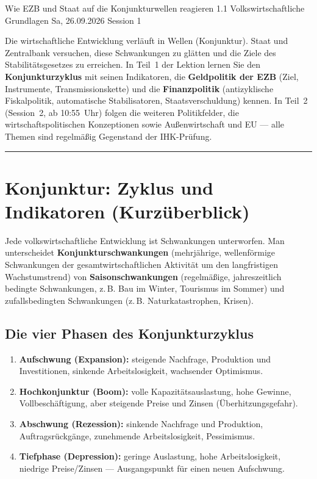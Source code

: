 \documentclass[11pt, a4paper]{article}
\begin{document}
%
  {Wie EZB und Staat auf die Konjunkturwellen reagieren}%
  {1.1 Volkswirtschaftliche Grundlagen}%
  {Sa, 26.09.2026 \textperiodcentered{} Session 1}

\begin{merksatz}[title={\bfseries Worum geht es in diesem Teil?}]
Die wirtschaftliche Entwicklung verläuft in Wellen (Konjunktur). Staat und Zentralbank
versuchen, diese Schwankungen zu glätten und die Ziele des Stabilitätsgesetzes zu erreichen.
In Teil~1 der Lektion lernen Sie den \textbf{Konjunkturzyklus} mit seinen Indikatoren, die
\textbf{Geldpolitik der EZB} (Ziel, Instrumente, Transmissionskette) und die
\textbf{Finanzpolitik} (antizyklische Fiskalpolitik, automatische Stabilisatoren,
Staatsverschuldung) kennen. In Teil~2 (Session~2, ab 10:55~Uhr) folgen die weiteren
Politikfelder, die wirtschaftspolitischen Konzeptionen sowie Außenwirtschaft und EU ---
alle Themen sind regelmäßig Gegenstand der IHK-Prüfung.
\end{merksatz}

\tableofcontents
\vspace{1em}
\hrule
\vspace{1em}

\section{Konjunktur: Zyklus und Indikatoren (Kurzüberblick)}

Jede volkswirtschaftliche Entwicklung ist Schwankungen unterworfen. Man unterscheidet
\textbf{Konjunkturschwankungen} (mehrjährige, wellenförmige Schwankungen der
gesamtwirtschaftlichen Aktivität um den langfristigen Wachstumstrend) von
\textbf{Saisonschwankungen} (regelmäßige, jahreszeitlich bedingte Schwankungen, z.\,B.
Bau im Winter, Tourismus im Sommer) und zufallsbedingten Schwankungen (z.\,B.
Naturkatastrophen, Krisen).

\subsection{Die vier Phasen des Konjunkturzyklus}

\begin{enumerate}
  \item \textbf{Aufschwung (Expansion):} steigende Nachfrage, Produktion und
    Investitionen, sinkende Arbeitslosigkeit, wachsender Optimismus.
  \item \textbf{Hochkonjunktur (Boom):} volle Kapazitätsauslastung, hohe Gewinne,
    Vollbeschäftigung, aber steigende Preise und Zinsen (Überhitzungsgefahr).
  \item \textbf{Abschwung (Rezession):} sinkende Nachfrage und Produktion,
    Auftragsrückgänge, zunehmende Arbeitslosigkeit, Pessimismus.
  \item \textbf{Tiefphase (Depression):} geringe Auslastung, hohe Arbeitslosigkeit,
    niedrige Preise/Zinsen --- Ausgangspunkt für einen neuen Aufschwung.
\end{enumerate}
\end{document}
